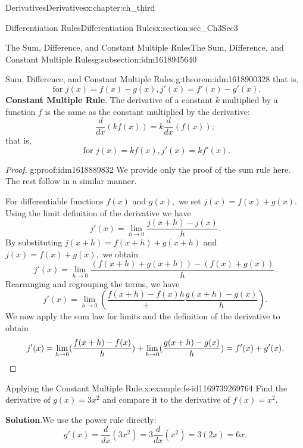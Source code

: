 \documentclass[oneside,10pt,]{book}
\newcommand{\blocktitlefont}{\relax}
\newcommand{\terminology}[1]{\textbf{#1}}
\numberwithin{equation}{section}
\newcommand{\qedhere}{\relax}
\begin{document}
\begin{chapterptx}{Derivatives}{}{Derivatives}{}{}{x:chapter:ch_third}
\begin{sectionptx}{Differentiation Rules}{}{Differentiation Rules}{}{}{x:section:sec_Ch3Sec3}
\begin{subsectionptx}{The Sum, Difference, and Constant Multiple Rules}{}{The Sum, Difference, and Constant Multiple Rules}{}{}{g:subsection:idm1618945640}
\begin{theorem}{Sum, Difference, and Constant Multiple Rules.}{}{g:theorem:idm1618900328}
that is,%
%
\begin{equation*}
\text{ for } j(x)=f(x)-g(x),j'(x)=f'(x)-g'(x).
\end{equation*}
\terminology{Constant Multiple Rule}. The derivative of a constant \(k\) multiplied by a function \(f\) is the same as the constant multiplied by the derivative:%
%
\begin{equation*}
\frac{d}{dx}(kf(x))=k\frac{d}{dx}(f(x));
\end{equation*}
that is,%
%
\begin{equation*}
\text{ for } j(x)=kf(x),j'(x)=kf'(x).
\end{equation*}
\end{theorem}
\begin{proof}{}{g:proof:idm1618889832}
We provide only the proof of the sum rule here. The rest follow in a similar manner.%
\par
For differentiable functions \(f(x)\) and \(g(x),\) we set \(j(x)=f(x)+g(x).\) Using the limit definition of the derivative we have%
%
\begin{equation*}
j'(x)=\lim_{h\to 0}\frac{j(x+h)-j(x)}{h}.
\end{equation*}
By substituting \(j(x+h)=f(x+h)+g(x+h)\) and \(j(x)=f(x)+g(x),\) we obtain%
%
\begin{equation*}
j'(x)=\lim_{h\to 0}\frac{(f(x+h)+g(x+h))-(f(x)+g(x))}{h}.
\end{equation*}
Rearranging and regrouping the terms, we have%
%
\begin{equation*}
j'(x)=\lim_{h\to 0}(\frac{f(x+h)-f(x)h}+\frac{g(x+h)-g(x)}{h}).
\end{equation*}
We now apply the sum law for limits and the definition of the derivative to obtain%
%
\begin{equation*}
j'(x)=\lim_{h\to 0}(\frac{f(x+h)-f(x)}{h})+\lim_{h\to 0}(\frac{g(x+h)-g(x)}{h})=f'(x)+g'(x).\qedhere
\end{equation*}
\end{proof}
\begin{example}{Applying the Constant Multiple Rule.}{x:example:fs-id1169739269764}%
Find the derivative of \(g(x)=3x^2\) and compare it to the derivative of \(f(x)=x^2.\)%
\par\smallskip%
\noindent\textbf{\blocktitlefont Solution}.\hypertarget{g:solution:idm1618879720}{}\quad{}We use the power rule directly:%
%
\begin{equation*}
g'(x)=\frac{d}{dx}(3x^2)=3\frac{d}{dx}(x^2)=3(2x)=6x.
\end{equation*}

\end{example}
\end{subsectionptx}
\end{sectionptx}
\end{chapterptx}
\end{document}
